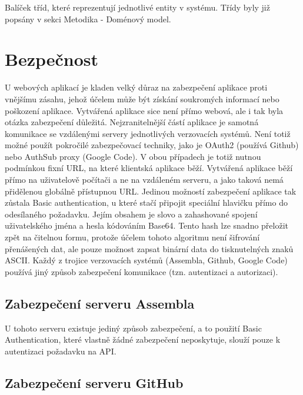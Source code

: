 Balíček tříd, které reprezentují jednotlivé entity v systému. Třídy byly již popsány v sekci Metodika - Doménový model.

\section{Bezpečnost}

U webových aplikací je kladen velký důraz na zabezpečení aplikace proti vnějšímu zásahu, jehož účelem může být získání soukromých informací nebo poškození aplikace. Vytvářená aplikace sice není přímo webová, ale i tak byla otázka zabezpečení důležitá. Nejzranitelnější částí aplikace je samotná komunikace se vzdálenými servery jednotlivých verzovacích systémů. Není totiž možné použít pokročilé zabezpečovací techniky, jako je OAuth2 (používá Github) nebo AuthSub proxy (Google Code). V obou případech je totiž nutnou podmínkou fixní URL, na které klientská aplikace běží. Vytvářená aplikace běží přímo na uživatelově počítači a ne na vzdáleném serveru, a jako taková nemá přidělenou globálně přístupnou URL. Jedinou možností zabezpečení aplikace tak zůstala Basic authentication, u které stačí připojit speciální hlavičku  přímo do odesílaného požadavku. Jejím obsahem je slovo  a zahashované spojení uživatelského jména a hesla kódováním Base64. Tento hash lze snadno přeložit zpět na čitelnou formu, protože účelem tohoto algoritmu není šifrování přenášených dat, ale pouze možnost zapsat binární data do tisknutelných znaků ASCII. Každý z trojice verzovacích systémů (Assembla, Github, Google Code) používá jiný způsob zabezpečení komunikace (tzn. autentizaci a autorizaci). 

\subsection{Zabezpečení serveru Assembla}

U tohoto serveru existuje jediný způsob zabezpečení\cite{assemblaauth}, a to použití Basic Authentication, které vlastně žádné zabezpečení neposkytuje, slouží pouze k autentizaci požadavku na API.

\subsection{Zabezpečení serveru GitHub}

